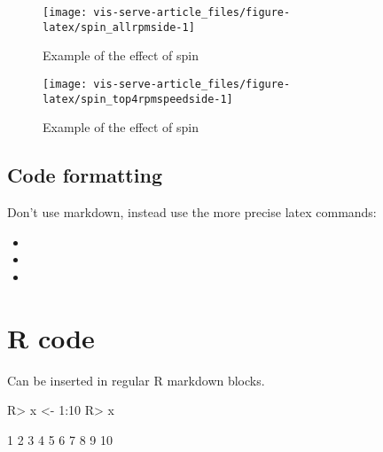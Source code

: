 \documentclass[article]{jss}
\providecommand{\tightlist}{%
  \setlength{\itemsep}{0pt}\setlength{\parskip}{0pt}}
\begin{document}
\begin{CodeChunk}
\begin{figure}

{\centering \texttt{[image: vis-serve-article\_files/figure-latex/spin\_allrpmside-1]} 

}

\caption[Example of the effect of spin]{Example of the effect of spin}\label{fig:spin_allrpmside}
\end{figure}
\end{CodeChunk}

\begin{CodeChunk}
\begin{figure}

{\centering \texttt{[image: vis-serve-article\_files/figure-latex/spin\_top4rpmspeedside-1]} 

}

\caption[Example of the effect of spin]{Example of the effect of spin}\label{fig:spin_top4rpmspeedside}
\end{figure}
\end{CodeChunk}

\subsection{Code formatting}\label{code-formatting}

Don't use markdown, instead use the more precise latex commands:

\begin{itemize}
\tightlist
\item
\item
\item
\end{itemize}

\section{R code}\label{r-code}

Can be inserted in regular R markdown blocks.

\begin{CodeChunk}
\begin{CodeInput}
R> x <- 1:10
R> x
\end{CodeInput}
\begin{CodeOutput}
 [1]  1  2  3  4  5  6  7  8  9 10
\end{CodeOutput}
\end{CodeChunk}
\end{document}
